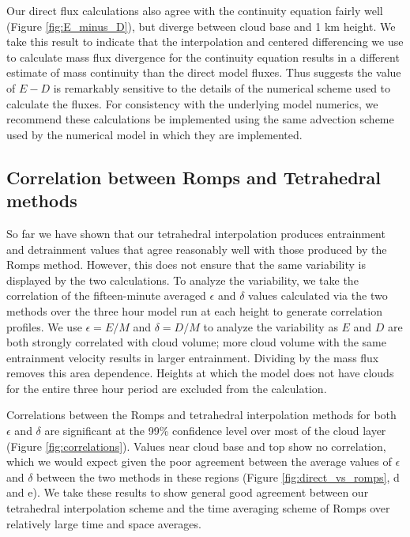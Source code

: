 \documentclass[12pt]{article}
\begin{document}
Our direct flux calculations also agree with the continuity equation fairly 
well (Figure \ref{fig:E_minus_D}), but diverge between cloud base and 1 km 
height.  We take this result to indicate that the interpolation and centered 
differencing we use to calculate mass flux divergence for the continuity 
equation results in a different estimate of mass continuity than the direct 
model fluxes.  Thus suggests the value of $E-D$ is remarkably sensitive to 
the details of the numerical scheme used to calculate the fluxes.  For 
consistency with the underlying model numerics, we recommend these 
calculations be implemented using the same advection scheme used by the 
numerical model in which they are implemented.


\subsection{Correlation between Romps and Tetrahedral methods}

So far we have shown that our tetrahedral interpolation produces entrainment 
and detrainment values that agree reasonably well with those produced by the 
Romps method.  However, this does not ensure that the same variability is 
displayed by the two calculations.  To analyze the variability, we take the 
correlation of the fifteen-minute averaged $\epsilon$ and $\delta$ values 
calculated via the two methods over the three hour model run at each height 
to generate correlation profiles.  We use $\epsilon = E/M$ and $\delta = D/M$ 
to analyze the variability as $E$ and $D$ are both strongly correlated with 
cloud volume; more cloud volume with the same entrainment velocity results in 
larger entrainment.  Dividing by the mass flux removes this area dependence.
Heights at which the model does not have clouds for the entire three hour 
period are excluded from the calculation.  

Correlations between the Romps and tetrahedral interpolation methods for both 
$\epsilon$ and $\delta$ are significant at the 99\% confidence level over most 
of the cloud layer (Figure \ref{fig:correlations}).  Values near cloud 
base and top show no correlation, which we would expect given the poor 
agreement between the average values of $\epsilon$ and $\delta$ between the 
two methods in these regions (Figure \ref{fig:direct_vs_romps}, d and e).  We
take these results to show general good agreement between our tetrahedral 
interpolation scheme and the time averaging scheme of Romps over relatively 
large time and space averages.  
\end{document}
